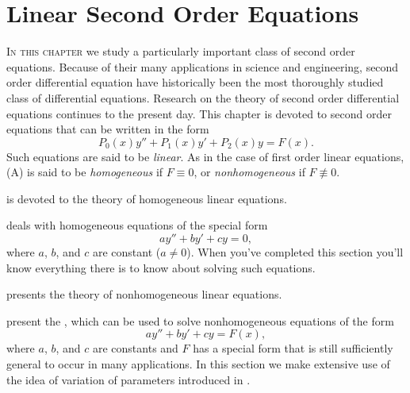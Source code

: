 
\chapter{Linear Second Order Equations}\label{ch:second_order}


\noindent
\textsc{In this chapter} we study a particularly important class of
second order equations.
Because of their many applications in science and engineering, second
order differential equation have historically been the most thoroughly
studied class of differential equations. Research on the theory of
second order differential equations continues to the present day. This
chapter is devoted to second order equations that can be written in
the form
\[
P_0(x)y''+P_1(x)y'+P_2(x)y=F(x).
\]
Such equations are said to be \emph{\color{blue}linear}. As in the case of first
order linear equations, (A) is said to be \emph{\color{blue}homogeneous}
if $F\equiv0$, or \emph{\color{blue}nonhomogeneous} if $F\not\equiv0$.

\medskip\noindent
{} is devoted to the theory of homogeneous linear
equations.


\medskip\noindent
{} deals with homogeneous equations of the
special form
\[
ay''+by'+cy=0,
\]
where $a$, $b$, and $c$ are constant ($a\ne0$). When you've
completed this section you'll know everything there is to know about
solving such equations.


\medskip\noindent
{} presents the theory of nonhomogeneous linear
equations.


\medskip\noindent
{}
present  the , which can be used to solve
nonhomogeneous equations of the form
\[
ay''+by'+cy=F(x),
\]
where $a$, $b$, and $c$ are constants and $F$ has a special form that
is still sufficiently general to occur in many applications. In this
section  we make extensive use of the idea of variation of
parameters
introduced in .


